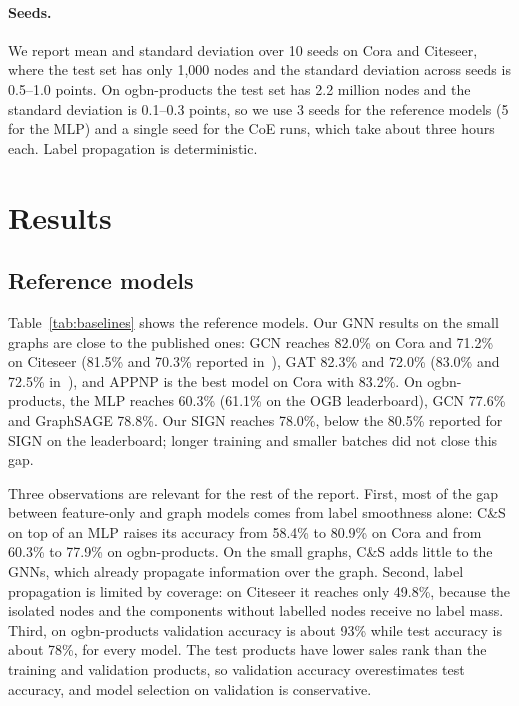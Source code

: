 \documentclass[sigconf,nonacm]{acmart}
\begin{document}
\paragraph{Seeds.}
We report mean and standard deviation over 10 seeds on Cora and Citeseer, where the test set has only 1{,}000 nodes and the standard deviation across seeds is 0.5--1.0 points.
On ogbn-products the test set has 2.2 million nodes and the standard deviation is 0.1--0.3 points, so we use 3 seeds for the reference models (5 for the MLP) and a single seed for the CoE runs, which take about three hours each.
Label propagation is deterministic.

\section{Results}

\subsection{Reference models}
\label{sec:baselines}

\begin{table}[t]
\caption{Test accuracy (\%) of the reference models, without and with C\&S post-processing. Mean $\pm$ standard deviation over seeds; best per dataset in bold. GAT is not run on ogbn-products.}
\label{tab:baselines}

\end{table}

Table~\ref{tab:baselines} shows the reference models.
Our GNN results on the small graphs are close to the published ones: GCN reaches 82.0\% on Cora and 71.2\% on Citeseer (81.5\% and 70.3\% reported in~\cite{kipf2017gcn}), GAT 82.3\% and 72.0\% (83.0\% and 72.5\% in~\cite{velickovic2018gat}), and APPNP is the best model on Cora with 83.2\%.
On ogbn-products, the MLP reaches 60.3\% (61.1\% on the OGB leaderboard), GCN 77.6\% and GraphSAGE 78.8\%.
Our SIGN reaches 78.0\%, below the 80.5\% reported for SIGN on the leaderboard; longer training and smaller batches did not close this gap.

Three observations are relevant for the rest of the report.
First, most of the gap between feature-only and graph models comes from label smoothness alone: C\&S on top of an MLP raises its accuracy from 58.4\% to 80.9\% on Cora and from 60.3\% to 77.9\% on ogbn-products.
On the small graphs, C\&S adds little to the GNNs, which already propagate information over the graph.
Second, label propagation is limited by coverage: on Citeseer it reaches only 49.8\%, because the isolated nodes and the components without labelled nodes receive no label mass.
Third, on ogbn-products validation accuracy is about 93\% while test accuracy is about 78\%, for every model.
The test products have lower sales rank than the training and validation products, so validation accuracy overestimates test accuracy, and model selection on validation is conservative.
\end{document}

